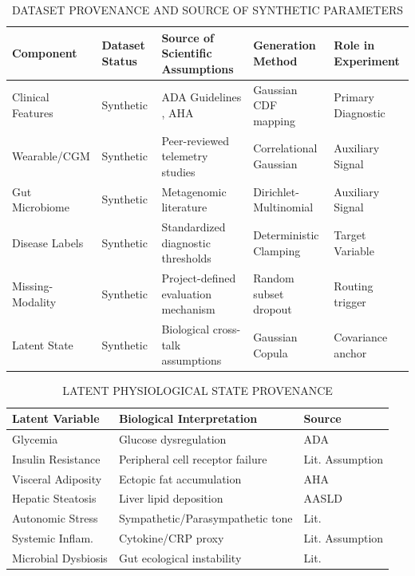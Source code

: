 \documentclass[journal, twocolumn]{IEEEtran}
\begin{document}
\begin{table}[htbp]
\centering
\caption{DATASET PROVENANCE AND SOURCE OF SYNTHETIC PARAMETERS}
\begin{tabular}{|p{3cm}|p{2.5cm}|p{4.5cm}|p{3.5cm}|p{2.5cm}|}
\hline
\textbf{Component} & \textbf{Dataset Status} & \textbf{Source of Scientific Assumptions} & \textbf{Generation Method} & \textbf{Role in Experiment} \\
\hline
Clinical Features & Synthetic & ADA Guidelines \cite{ada2024standards}, AHA & Gaussian CDF mapping & Primary Diagnostic \\
Wearable/CGM & Synthetic & Peer-reviewed telemetry studies \cite{dunn2021wearables} & Correlational Gaussian & Auxiliary Signal \\
Gut Microbiome & Synthetic & Metagenomic literature \cite{goh2022microbiome} & Dirichlet-Multinomial & Auxiliary Signal \\
Disease Labels & Synthetic & Standardized diagnostic thresholds & Deterministic Clamping & Target Variable \\
Missing-Modality & Synthetic & Project-defined evaluation mechanism & Random subset dropout & Routing trigger \\
Latent State & Synthetic & Biological cross-talk assumptions & Gaussian Copula & Covariance anchor \\
\hline
\end{tabular}
\end{table}

\begin{table}[htbp]
\centering
\caption{LATENT PHYSIOLOGICAL STATE PROVENANCE}
\begin{tabular}{|p{2.5cm}|p{3.5cm}|p{1.5cm}|}
\hline
\textbf{Latent Variable} & \textbf{Biological Interpretation} & \textbf{Source} \\
\hline
Glycemia & Glucose dysregulation & ADA \cite{ada2024standards} \\
Insulin Resistance & Peripheral cell receptor failure & Lit. Assumption \\
Visceral Adiposity & Ectopic fat accumulation & AHA \\
Hepatic Steatosis & Liver lipid deposition & AASLD \\
Autonomic Stress & Sympathetic/Parasympathetic tone & Lit. \cite{dunn2021wearables} \\
Systemic Inflam. & Cytokine/CRP proxy & Lit. Assumption \\
Microbial Dysbiosis & Gut ecological instability & Lit. \cite{goh2022microbiome} \\
\hline
\end{tabular}
\end{table}
\end{document}
